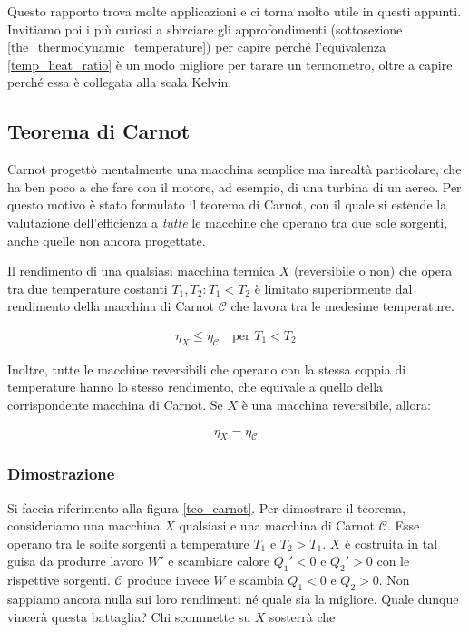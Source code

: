 \noindent Questo rapporto trova molte applicazioni e ci torna
molto utile in questi appunti. Invitiamo poi i più curiosi a sbirciare
gli approfondimenti (sottosezione \ref{the_thermodynamic_temperature})
per capire perché l'equivalenza \ref{temp_heat_ratio}
è un modo migliore per tarare un termometro, oltre a capire perché essa
è collegata alla scala Kelvin.


\subsection{Teorema di Carnot}
Carnot progettò mentalmente una macchina semplice ma inrealtà
particolare, che ha ben poco a che fare con il motore, ad esempio,
di una turbina di un aereo. Per questo motivo è stato formulato
il teorema di Carnot, con il quale si estende la valutazione
dell'efficienza a \textit{tutte} le macchine che operano tra due
sole sorgenti, anche quelle non ancora progettate.


\begin{tcolorbox}[colback = red!30, colframe = red!30!black, title = {Teorema di Carnot}]
Il rendimento di una qualsiasi macchina termica $X$ (reversibile o non)
che opera tra due
temperature costanti $T_1,T_2: T_1 < T_2$ è limitato superiormente dal rendimento della
macchina di Carnot $\mathcal{C}$ che lavora tra le medesime temperature.

\begin{align}
    \eta_X \leq \eta_\mathcal{C} \quad \text{per } T_1 < T_2\label{carnot1}
\end{align}

Inoltre, tutte le macchine reversibili che operano con la stessa coppia di temperature
hanno lo stesso rendimento, che equivale a quello della corrispondente macchina di
Carnot. Se $X$ è una macchina reversibile, allora:

\begin{align}
    \eta_X = \eta_\mathcal{C}\label{carnot2}
\end{align}

\end{tcolorbox}


\subsubsection*{Dimostrazione}
Si faccia riferimento alla figura \ref{teo_carnot}.
Per dimostrare il teorema, consideriamo una macchina $X$ qualsiasi
e una macchina di Carnot $\mathcal{C}$. Esse operano tra le solite
sorgenti a temperature $T_1$ e $T_2 > T_1$.
$X$ è costruita in tal guisa da produrre lavoro $W'$ e scambiare
calore $Q_1' < 0$ e $Q_2' > 0$ con le rispettive sorgenti. $\mathcal{C}$
produce invece $W$ e scambia $Q_1 < 0$ e $Q_2 > 0$.
Non sappiamo ancora nulla sui loro rendimenti né quale sia la migliore.
Quale dunque vincerà questa battaglia?
Chi scommette su $X$ sosterrà che

